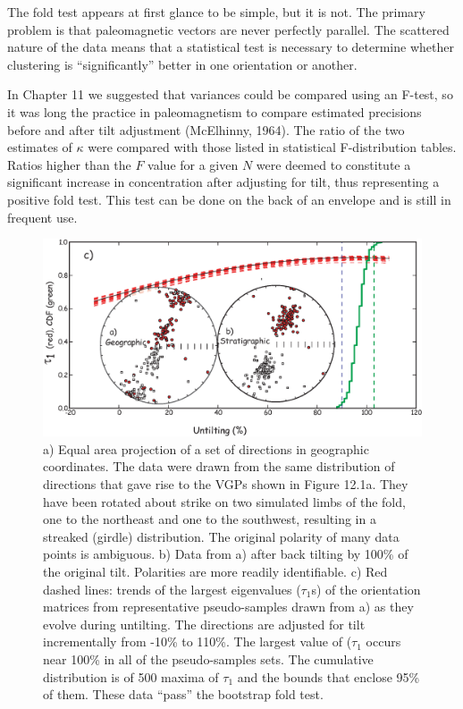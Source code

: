 The fold test appears at first glance
 to be simple, but it is not.
The primary problem is that paleomagnetic
vectors are never perfectly parallel.  The
scattered nature of the data means that a statistical test is
necessary to determine whether clustering is ``significantly'' better
in one orientation or another.


In Chapter 11 we suggested that variances could be compared using an F-test, so it was long the practice in paleomagnetism to compare estimated precisions  before and after tilt adjustment
 (McElhinny, 1964). \nocite{mcelhinny64}
The ratio of the two estimates of $\kappa$ were 
 compared 
with those listed in statistical
 F-distribution tables. Ratios higher than  the 
$F$ value for a given $N$ were deemed to constitute a significant increase in
concentration after adjusting for tilt,  thus representing
 a positive fold test.  This
test can be done on the back of an envelope and  is still in frequent use.

\begin{figure}[htb]
\centering  \includegraphics[width=14 cm]{EPSfiles/unfolding.eps}
\caption{
a) Equal area projection of a set of directions in geographic coordinates.
The data were drawn from the same distribution  of directions that gave rise to the VGPs shown in Figure 12.1a.  They have been rotated about strike on two simulated limbs of the fold, one to the northeast and one to the southwest, resulting in  a streaked (girdle) distribution.  The  original polarity of many
data points is ambiguous.  b) Data from a) after back tilting by  100\% of the original tilt.     Polarities
are more readily identifiable.  
c) Red dashed lines: trends of the largest eigenvalues ($\tau_1$s) of the orientation matrices
from representative pseudo-samples drawn from a) as they evolve during untilting.  The
directions are adjusted for tilt incrementally from -10\% to 110\%.  The
largest value of ($\tau_1$ occurs near 100\% in all of the pseudo-samples
sets. The cumulative distribution is of 500 maxima of $\tau_1$ and the bounds that enclose 95\% of them.     These data
``pass'' the bootstrap fold test.}
\label{fig:foldtest}
\end{figure}


